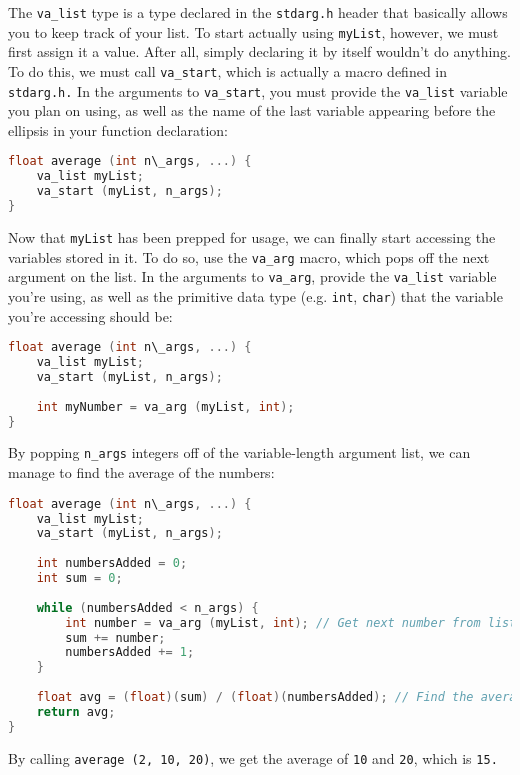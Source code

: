 The \texttt{va\_list} type is a type declared in the \texttt{stdarg.h} header
that basically allows you to keep track of your list. To start actually using
\texttt{myList}, however, we must first assign it a value. After all, simply
declaring it by itself wouldn't do anything. To do this, we must call
\texttt{va\_start}, which is actually a macro defined in \texttt{stdarg.h.} In
the arguments to \texttt{va\_start}, you must provide the \texttt{va\_list}
variable you plan on using, as well as the name of the last variable appearing
before the ellipsis in your function declaration:
\lstset{basicstyle=\scriptsize, numbers=left, captionpos=b, tabsize=4}
\begin{lstlisting}[caption=Section \thesection listing \arabic{funccnt},language={C},
breaklines=true,xleftmargin=15pt, label=lst:section\thesection listing\arabic{funccnt}]
float average (int n\_args, ...) {
	va_list myList;
	va_start (myList, n_args);
}
\end{lstlisting}

Now that \texttt{myList} has been prepped for usage, we can finally start
accessing the variables stored in it. To do so, use the \texttt{va\_arg} macro,
which pops off the next argument on the list. In the arguments to
\texttt{va\_arg}, provide the \texttt{va\_list} variable you're using, as well
as the primitive data type (e.g. \texttt{int}, \texttt{char}) that the variable
you're accessing should be:
\lstset{basicstyle=\scriptsize, numbers=left, captionpos=b, tabsize=4}
\begin{lstlisting}[caption=Section \thesection listing \arabic{funccnt},language={C},
breaklines=true,xleftmargin=15pt, label=lst:section\thesection listing\arabic{funccnt}]
float average (int n\_args, ...) {
	va_list myList;
	va_start (myList, n_args);
	
	int myNumber = va_arg (myList, int);
}
\end{lstlisting}

By popping \texttt{n\_args} integers off of the variable-length argument list,
we can manage to find the average of the numbers:
\lstset{basicstyle=\scriptsize, numbers=left, captionpos=b, tabsize=4}
\begin{lstlisting}[caption=Section \thesection listing \arabic{funccnt},language={C},
breaklines=true,xleftmargin=15pt, label=lst:section\thesection listing\arabic{funccnt}]
float average (int n\_args, ...) {
	va_list myList;
	va_start (myList, n_args);
	
	int numbersAdded = 0;
	int sum = 0;
	 
	while (numbersAdded < n_args) {
		int number = va_arg (myList, int); // Get next number from list
		sum += number;
		numbersAdded += 1;
	}
	 
	float avg = (float)(sum) / (float)(numbersAdded); // Find the average
	return avg;
}
\end{lstlisting}

By calling \texttt{average (2, 10, 20)}, we get the average of \texttt{10} and
\texttt{20}, which is \texttt{15.}
